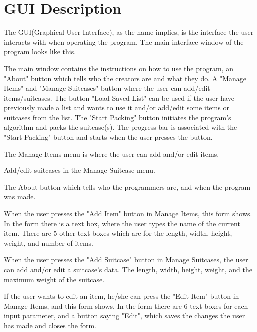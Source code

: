 \section{GUI Description}

The GUI(Graphical User Interface), as the name implies, is the interface the user interacts with when operating the program.
The main interface window of the program looks like this.


The main window contains the instructions on how to use the program, an "About" button which tells who the creators are and what they do. A "Manage Items" and "Manage Suitcases" button where the user can add/edit items/suitcases. The button "Load Saved List" can be used if the user have previously made a list and wants to use it and/or add/edit some items or suitcases from the list. The "Start Packing" button initiates the program's algorithm and packs the suitcase(s). The progress bar is associated with the "Start Packing" button and starts when the user presses the button.

The Manage Items menu is where the user can add and/or edit items.

Add/edit suitcases in the Manage Suitcase menu.

The About button which tells who the programmers are, and when the program was made.

When the user presses the "Add Item" button in Manage Items, this form shows. In the form there is a text box, where the user types the name of the current item. There are 5 other text boxes which are for the length, width, height, weight, and number of items.

When the user presses the "Add Suitcase" button in Manage Suitcases, the user can add and/or edit a suitcase's data. The length, width, height, weight, and the maximum weight of the suitcase. 

If the user wants to edit an item, he/she can press the "Edit Item" button in Manage Items, and this form shows. In the form there are 6 text boxes for each input parameter, and a button saying "Edit", which saves the changes the user has made and closes the form.

